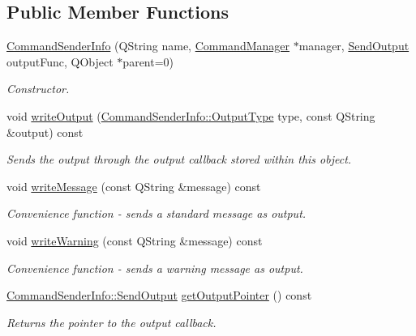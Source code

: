 \subsection*{Public Member Functions}
\begin{DoxyCompactItemize}
\item 
\hyperlink{class_command_sender_info_a90b5920cd66643c18446c92658453127}{Command\-Sender\-Info} (Q\-String name, \hyperlink{class_command_manager}{Command\-Manager} $\ast$manager, \hyperlink{class_command_sender_info_a68c494ef69a25ac7bf667b83e24639ed}{Send\-Output} output\-Func, Q\-Object $\ast$parent=0)
\begin{DoxyCompactList}\small\item\em Constructor. \end{DoxyCompactList}\item 
void \hyperlink{class_command_sender_info_a405f18d255eb60211b373bf58c287d05}{write\-Output} (\hyperlink{class_command_sender_info_a3a5e6a2ef1772f6557f351652c2e3b60}{Command\-Sender\-Info\-::\-Output\-Type} type, const Q\-String \&output) const 
\begin{DoxyCompactList}\small\item\em Sends the output through the output callback stored within this object. \end{DoxyCompactList}\item 
void \hyperlink{class_command_sender_info_a0d081d74145ea6a83502acee2d995e50}{write\-Message} (const Q\-String \&message) const 
\begin{DoxyCompactList}\small\item\em Convenience function -\/ sends a standard message as output. \end{DoxyCompactList}\item 
void \hyperlink{class_command_sender_info_a7c679e9584183f503e322e4149c28dde}{write\-Warning} (const Q\-String \&message) const 
\begin{DoxyCompactList}\small\item\em Convenience function -\/ sends a warning message as output. \end{DoxyCompactList}\item 
\hyperlink{class_command_sender_info_a68c494ef69a25ac7bf667b83e24639ed}{Command\-Sender\-Info\-::\-Send\-Output} \hyperlink{class_command_sender_info_a3a1ced23a109a8163dc94f7dd380a96f}{get\-Output\-Pointer} () const 
\begin{DoxyCompactList}\small\item\em Returns the pointer to the output callback. \end{DoxyCompactList}\item 

\end{DoxyCompactItemize}
